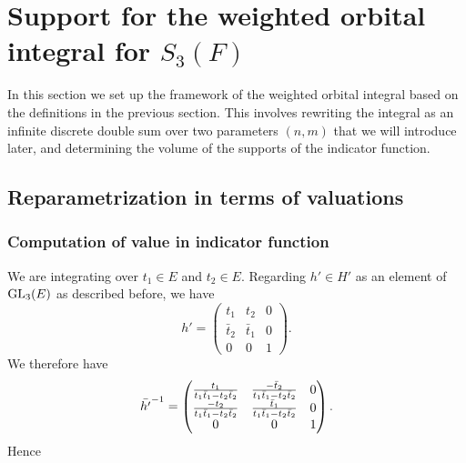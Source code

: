 \chapter{Support for the weighted orbital integral for $S_3(F)$}
\label{ch:orbital1}

In this section we set up the framework of the weighted orbital integral
based on the definitions in the previous section.
This involves rewriting the integral as an infinite discrete double sum
over two parameters $(n,m)$ that we will introduce later,
and determining the volume of the supports of the indicator function.

\section{Reparametrization in terms of valuations}
\subsection{Computation of value in indicator function}
We are integrating over $t_1 \in E$ and $t_2 \in E$.
Regarding $h' \in H'$ as an element of $\operatorname{GL}_3(E)$ as described before, we have
\[ h' = \begin{pmatrix}
  t_1 & t_2 & 0  \\
  \bar t_2 & \bar t_1 & 0 \\
  0 & 0 & 1
  \end{pmatrix}. \]
We therefore have
\[ \bar{h'}^{-1} = \begin{pmatrix}
  \frac{t_1}{t_1 \bar t_1 - t_2 \bar t_2} & \frac{-\bar t_2}{t_1 \bar t_1 - t_2 \bar t_2} & 0 \\
  \frac{-t_2}{t_1 \bar t_1 - t_2 \bar t_2} & \frac{\bar t_1}{t_1 \bar t_1 - t_2 \bar t_2} & 0 \\
  0 & 0 & 1 \end{pmatrix}. \]
Hence
